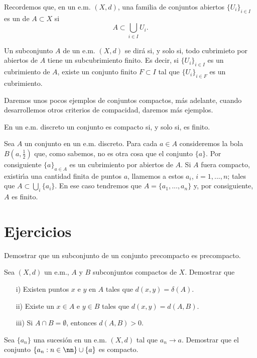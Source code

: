 Recordemos que, en un e.m. $(X,d)$, una familia de conjuntos
abiertos $\{U_i\}_{i\in I}$ es un  de $A\subset X$ si
\[
    A\subset\bigcup\limits_{i\in I}U_i.
\]
\begin{definicion} Un subconjunto $A$ de un e.m. $(X,d)$ se dir\'a
 si, y solo si, todo cubrimieto por
abiertos de $A$ tiene un subcubrimiento finito. Es decir, si
$\{U_i\}_{i\in I}$ es un cubrimiento  de $A$, existe un conjunto
finito $F\subset I$ tal que $\{U_i\}_{i\in F}$ es un cubrimiento.
\end{definicion}

Daremos unos pocos ejemplos de conjuntos compactos, m\'as
adelante, cuando desarrollemos otros criterios de compacidad,
daremos m\'as ejemplos.

\begin{proposicion} En un e.m. discreto un conjunto es compacto
si, y solo si, es finito.
\end{proposicion}
\begin{demo} Sea $A$ un conjunto en un e.m. discreto. Para cada
$a\in A$ consideremos la bola $B(a,\frac12)$ que, como sabemos, no
es otra cosa que el conjunto $\{a\}$. Por consiguiente
$\{a\}_{a\in A}$ es un cubrimiento por abiertos de $A$. Si $A$
fuera compacto, existir\'{\i}a una cantidad finita de puntos $a$,
llamemos a estos $a_i$, $i=1,...,n$; tales que $A\subset
\bigcup_i\{a_i\}$. En ese caso tendremos que $A=\{a_1,...,a_n\}$
y, por consiguiente, $A$ es finito.
\end{demo}


\section{Ejercicios}

\begin{ejercicio}\label{ejer,subpreespre} Demostrar que un
subconjunto de un conjunto precompacto es precompacto.
\end{ejercicio}

\begin{ejercicio} Sea $(X,d)$ un e.m., $A$ y $B$ subconjuntos compactos de
$X$. Demostrar que
\begin{itemize}
    \item[i)] Existen puntos $x$ e $y$ en $A$ tales que $d(x,y)=\delta(A)$.
    \item[ii)] Existe un $x\in A$ e $y\in B$ tales que
    $d(x,y)=d(A,B)$.
    \item[iii)] Si $A\cap B=\emptyset$, entonces $d(A,B)>0$.
\end{itemize}
\end{ejercicio}
\begin{ejercicio} Sea $\{a_n\}$ una sucesi\'on en un e.m. $(X,d)$
tal que $a_n\to a$. Demostrar que el conjunto
$\{a_n:n\in\nn\}\cup\{a\}$ es compacto.
\end{ejercicio}


